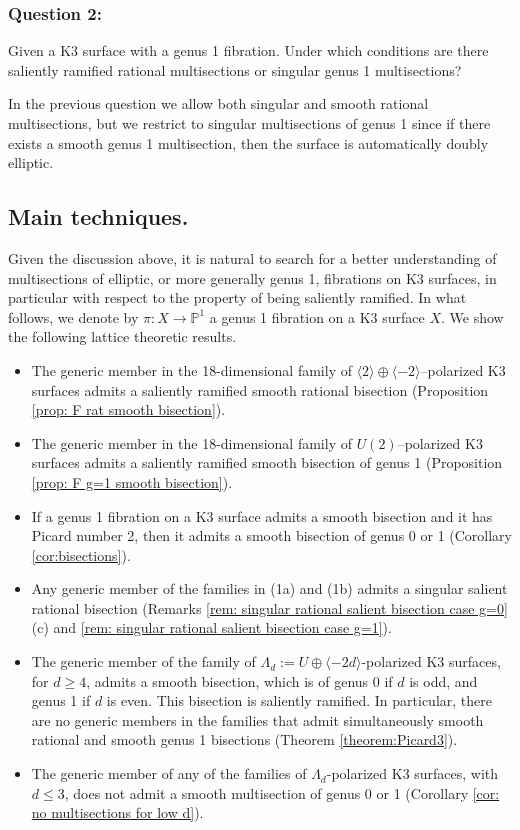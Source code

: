 \documentclass{amsart}
\theoremstyle{definition}
\numberwithin{equation}{section}
\begin{document}
\subsubsection*{Question 2:} Given a K3 surface with a genus 1 fibration. Under which conditions are there saliently ramified rational multisections or singular genus 1 multisections? 

\indent\par

In the previous question we allow both singular and smooth rational multisections, but we restrict to singular multisections of genus 1 since if there exists a smooth genus 1  multisection, then the surface is automatically doubly elliptic.

\subsection*{Main techniques.} 
 Given the discussion above, it is natural to search for a better understanding of multisections of elliptic, or more generally genus 1, fibrations on K3 surfaces, in particular with respect to the property of being saliently ramified. In what follows, we denote by $\pi: X \rightarrow \mathbb{P}^1$ a genus 1 fibration on a K3 surface $X$. We show the following lattice theoretic results.
\begin{itemize}
    \item[1a)] The generic member in the 18-dimensional family of $\langle 2\rangle \oplus \langle -2 \rangle$--polarized K3 surfaces admits a saliently ramified smooth rational bisection (Proposition \ref{prop: F rat smooth bisection}).
    \item[1b)]  The generic member in the 18-dimensional family of $U(2)$--polarized K3 surfaces admits a saliently ramified smooth bisection of genus 1 (Proposition \ref{prop: F g=1 smooth bisection}).
    \item[1c)] If a genus 1 fibration on a K3 surface admits a smooth bisection and it has Picard number 2, then it admits a smooth bisection of genus 0 or 1 (Corollary \ref{cor:bisections}).
    \item[1d)] Any generic member of the families in (1a) and (1b) admits a singular salient rational bisection (Remarks \ref{rem: singular rational salient bisection case g=0}(c) and \ref{rem: singular rational salient bisection case g=1}). 
    \item[2a)] The generic member of the family of $\Lambda_d:=U\oplus \langle -2d \rangle$-polarized K3 surfaces, for $d\geq 4$, admits a smooth bisection, which is of genus 0 if $d$ is odd, and genus 1 if $d$ is even. This bisection is saliently ramified. In particular, there are no generic members in the families that admit simultaneously  smooth rational and smooth genus 1 bisections (Theorem \ref{theorem:Picard3}).
    \item[2b)] The generic member of any of the families of $\Lambda_d$-polarized K3 surfaces, with $d\leq 3$, does not admit a smooth multisection of genus 0 or 1 (Corollary \ref{cor: no multisections for low d}).
 
\end{itemize}
\end{document}
